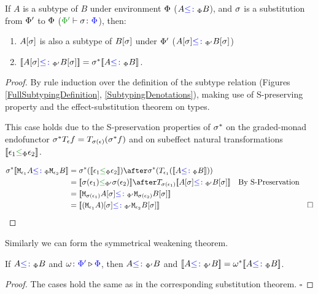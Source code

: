 \begin{framed}
    \begin{theorem}\label{EffectSubstitutionOnSubtyping}
        If $A$ is a subtype of $B$ under environment $\P$ ($A \subtypep B$), and $\si$ is a substitution from $\P'$ to $\P$ ($\typerelation{\P'}{\si}{\P}$), then:
        \begin{enumerate}[label=\roman*.]
            \item $A\ssi$ is also a subtype of $B\ssi$ under $\P'$ ($A\ssi\subtypepp B\ssi$)
            \item $\deno{A\ssi\subtypepp B\ssi} = \si\star\deno{A\subtypep B}$.
        \end{enumerate}
    \end{theorem}


\begin{proof}
    By rule induction over the definition of the subtype relation (Figures \ref{FullSubtypingDefinition}, \ref{SubtypingDenotations}), making use of S-preserving property and the effect-substitution theorem on types.

    \case{\seffect}
    This case holds due to the S-preservation properties of $\si\star$ on the graded-monad endofunctor $\si\star\T{\e}{f} = \T{\si(\e)}{(\si\star f)}$ and on subeffect natural transformations $\dsep{\e_1}{\e_2}$.

    \begin{align*}
        \si\star\deno{\M{\e_1}{A} \subtypep \M{\e_2}{B}} & = \si\star(\deno{\e_1\subeffectp\e_2})\after\si\star(\T{\e_1}(\deno{A\subtypep B})) \\ 
         &= \deno{\si(\e_1)\subeffectpp\si(\e_2)} \after \T{\si(\e_1)}{\deno{A\ssi\subtypepp B\ssi}}\qt{By S-Preservation}\\
         &= \deno{\M{\si(\e_1)}{A\ssi}\subtypepp\M{\si(\e_2)}{B\ssi}}\\
         &= \deno{(\M{\e_1}{A})\ssi\subtypepp\M{\e_2}{B}\ssi} & \square
    \end{align*}
\end{proof}
\end{framed}

Similarly we can form the symmetrical weakening theorem.

\begin{framed}
    \begin{theorem}\label{EffectWeakeningOnSubtyping}
        If $A \subtypep B$ and $\wrelw{\P'}{\P}$, then $A \subtypepp B$ and $\deno{A\subtypepp B} = \w\star\deno{A\subtypep B}$.
    \end{theorem}
    
    
    \begin{proof}
        The cases hold the same as in the corresponding substitution theorem. $\square$
    \end{proof}
\end{framed}

